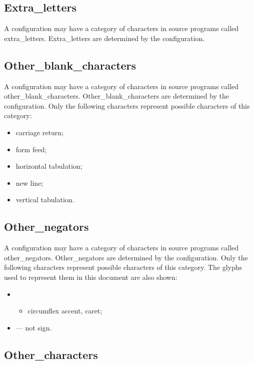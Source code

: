 \subsection{Extra\_letters}\label{extra_letters}

A configuration may have a category of characters in source programs
called extra\_letters. Extra\_letters are determined by the
configuration.

\subsection{Other\_blank\_characters}\label{other_blank_characters}

A configuration may have a category of characters in source programs
called other\_blank\_characters. Other\_blank\_characters are determined
by the configuration. Only the following characters represent possible
characters of this category:

\begin{itemize}
\item
  carriage return;
\item
  form feed;
\item
  horizontal tabulation;
\item
  new line;
\item
  vertical tabulation.
\end{itemize}

\subsection{Other\_negators}\label{other_negators}

A configuration may have a category of characters in source programs
called other\_negators. Other\_negators are determined by the
configuration. Only the following characters represent possible
characters of this category. The glyphs used to represent them in this
document are also shown:

\begin{itemize}
\tightlist
\item
  \begin{itemize}
  \tightlist
  \item
    circumflex accent, caret;
  \end{itemize}
\item
  --- not sign.
\end{itemize}

\subsection{Other\_characters}\label{other_characters}

